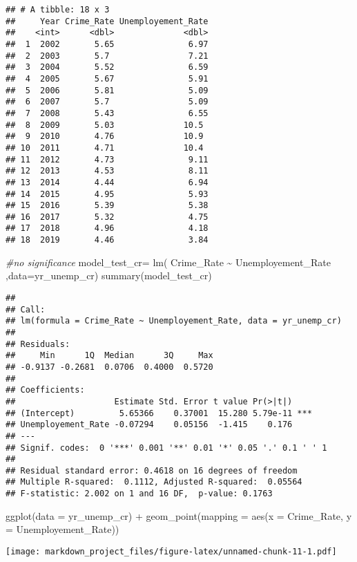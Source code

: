 \documentclass[
]{article}
\newenvironment{Shaded}{\begin{snugshade}}{\end{snugshade}}
\newcommand{\AttributeTok}[1]{\textcolor[rgb]{0.77,0.63,0.00}{#1}}
\newcommand{\CommentTok}[1]{\textcolor[rgb]{0.56,0.35,0.01}{\textit{#1}}}
\newcommand{\FunctionTok}[1]{\textcolor[rgb]{0.00,0.00,0.00}{#1}}
\newcommand{\NormalTok}[1]{#1}
\newcommand{\OtherTok}[1]{\textcolor[rgb]{0.56,0.35,0.01}{#1}}
\newcommand{\SpecialCharTok}[1]{\textcolor[rgb]{0.00,0.00,0.00}{#1}}
\begin{document}
\begin{verbatim}
## # A tibble: 18 x 3
##     Year Crime_Rate Unemployement_Rate
##    <int>      <dbl>              <dbl>
##  1  2002       5.65               6.97
##  2  2003       5.7                7.21
##  3  2004       5.52               6.59
##  4  2005       5.67               5.91
##  5  2006       5.81               5.09
##  6  2007       5.7                5.09
##  7  2008       5.43               6.55
##  8  2009       5.03              10.5 
##  9  2010       4.76              10.9 
## 10  2011       4.71              10.4 
## 11  2012       4.73               9.11
## 12  2013       4.53               8.11
## 13  2014       4.44               6.94
## 14  2015       4.95               5.93
## 15  2016       5.39               5.38
## 16  2017       5.32               4.75
## 17  2018       4.96               4.18
## 18  2019       4.46               3.84
\end{verbatim}

\begin{Shaded}
\begin{Highlighting}[]
\CommentTok{\#no significance}
\NormalTok{model\_test\_cr}\OtherTok{=} \FunctionTok{lm}\NormalTok{( Crime\_Rate }\SpecialCharTok{\textasciitilde{}}\NormalTok{ Unemployement\_Rate ,}\AttributeTok{data=}\NormalTok{yr\_unemp\_cr)}
\FunctionTok{summary}\NormalTok{(model\_test\_cr)}
\end{Highlighting}
\end{Shaded}

\begin{verbatim}
## 
## Call:
## lm(formula = Crime_Rate ~ Unemployement_Rate, data = yr_unemp_cr)
## 
## Residuals:
##     Min      1Q  Median      3Q     Max 
## -0.9137 -0.2681  0.0706  0.4000  0.5720 
## 
## Coefficients:
##                    Estimate Std. Error t value Pr(>|t|)    
## (Intercept)         5.65366    0.37001  15.280 5.79e-11 ***
## Unemployement_Rate -0.07294    0.05156  -1.415    0.176    
## ---
## Signif. codes:  0 '***' 0.001 '**' 0.01 '*' 0.05 '.' 0.1 ' ' 1
## 
## Residual standard error: 0.4618 on 16 degrees of freedom
## Multiple R-squared:  0.1112, Adjusted R-squared:  0.05564 
## F-statistic: 2.002 on 1 and 16 DF,  p-value: 0.1763
\end{verbatim}

\begin{Shaded}
\begin{Highlighting}[]
\FunctionTok{ggplot}\NormalTok{(}\AttributeTok{data =}\NormalTok{ yr\_unemp\_cr) }\SpecialCharTok{+}
  \FunctionTok{geom\_point}\NormalTok{(}\AttributeTok{mapping =} \FunctionTok{aes}\NormalTok{(}\AttributeTok{x =}\NormalTok{ Crime\_Rate, }\AttributeTok{y =}\NormalTok{ Unemployement\_Rate))}
\end{Highlighting}
\end{Shaded}

\texttt{[image: markdown\_project\_files/figure-latex/unnamed-chunk-11-1.pdf]}
\end{document}
